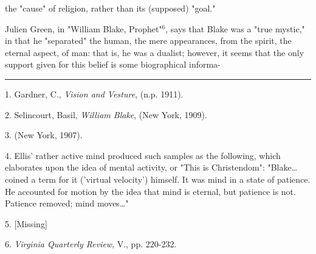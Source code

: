 the "cause" of religion, rather than its (supposed) "goal."\par
\vspace*{0.5\baselineskip}
Julien Green, in "William Blake, Prophet"$^{6}$, says that
Blake was a "true mystic," in that he "separated" the human,
the mere appearances, from the spirit, the eternal aspect, of man:
that is, he was a dualist; however, it seems that the only support given for this belief is some
biographical informa-\linebreak
\null\par
\vspace*{-\baselineskip}
\vspace*{\fill}
\noindent\rule{0.25\textwidth}{0.4pt}\par
1. Gardner, C., \textit{Vision and Vesture}, (n.p. 1911).\par
2. Selincourt, Basil, \textit{William Blake}, (New York, 1909).\par
3. (New York, 1907).\par
4. Ellis' rather active mind produced such samples as the following, which elaborates upon
the idea of mental activity, or "This is Christendom": "Blake\dots coined a term for it
('virtual velocity') himself. It was mind in a state of patience. He accounted for motion by the idea that
mind is eternal, but patience is not. Patience removed; mind moves\dots"\par
5. [Missing]\par
6. \textit{Virginia Quarterly Review}, V., pp. 220-232.\par

\newpage

